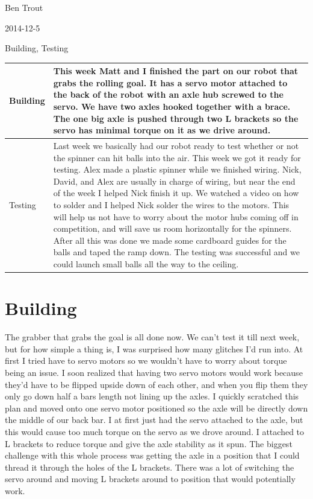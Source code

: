 Ben Trout

2014-12-5

Building, Testing 

\begin{tabular}{|p{5cm}|p{5cm}|}
\hline
Building&
This week Matt and I finished the part on our robot that grabs the rolling goal. It has a servo motor attached to the back of the robot with an axle hub screwed to the servo. We have two axles hooked together with a brace. The one big axle is pushed through two L brackets so the servo has minimal torque on it as we drive around.  
\\
\hline
Testing&
Last week we basically had our robot ready to test whether or not the spinner can hit balls into the air. This week we got it ready for testing. Alex made a plastic spinner while we finished wiring. Nick, David, and Alex are usually in charge of wiring, but near the end of the week I helped Nick finish it up. We watched a video on how to solder and I helped Nick solder the wires to the motors. This will help us not have to worry about the motor hubs coming off in competition, and will save us room horizontally for the spinners. After all this was done we made some cardboard guides for the balls and taped the ramp down. The testing was successful and we could launch small balls all the way to the ceiling. 
\\
\hline
\end{tabular}

\section*{Building}
The grabber that grabs the goal is all done now. We can’t test it till next week, but for how simple a thing is, I was surprised how many glitches I’d run into. At first I tried have to servo motors so we wouldn’t have to worry about torque being an issue. I soon realized that having two servo motors would work because they’d have to be flipped upside down of each other, and when you flip them they only go down half a bars length not lining up the axles. I quickly scratched this plan and moved onto one servo motor positioned so the axle will be directly down the middle of our back bar. I at first just had the servo attached to the axle, but this would cause too much torque on the servo as we drove around. I attached to L brackets to reduce torque and give the axle stability as it spun. The biggest challenge with this whole process was getting the axle in a position that I could thread it through the holes of the L brackets. There was a lot of switching the servo around and moving L brackets around to position that would potentially work.  

